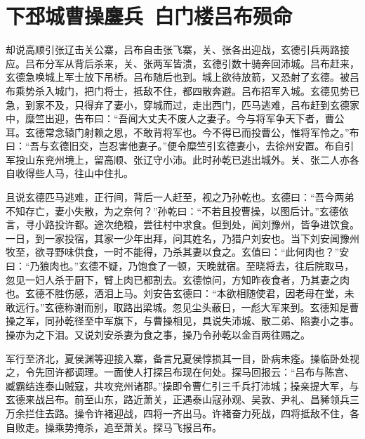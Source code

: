\chapter{下邳城曹操鏖兵~白门楼吕布殒命}

却说高顺引张辽击关公寨，吕布自击张飞寨，关、张各出迎战，玄德引兵两路接应。吕布分军从背后杀来，关、张两军皆溃，玄德引数十骑奔回沛城。吕布赶来，玄德急唤城上军士放下吊桥。吕布随后也到。城上欲待放箭，又恐射了玄德。被吕布乘势杀入城门，把门将士，抵敌不住，都四散奔避。吕布招军入城。玄德见势已急，到家不及，只得弃了妻小，穿城而过，走出西门，匹马逃难，吕布赶到玄德家中，糜竺出迎，告布曰：“吾闻大丈夫不废人之妻子。今与将军争天下者，曹公耳。玄德常念辕门射赖之恩，不敢背将军也。今不得已而投曹公，惟将军怜之。”布曰：“吾与玄德旧交，岂忍害他妻子。”便令糜竺引玄德妻小，去徐州安置。布自引军投山东兖州境上，留高顺、张辽守小沛。此时孙乾已逃出城外。关、张二人亦各自收得些人马，往山中住扎。

且说玄德匹马逃难，正行间，背后一人赶至，视之乃孙乾也。玄德曰：“吾今两弟不知存亡，妻小失散，为之奈何？”孙乾曰：“不若且投曹操，以图后计。”玄德依言，寻小路投许都。途次绝粮，尝往村中求食。但到处，闻刘豫州，皆争进饮食。一日，到一家投宿，其家一少年出拜，问其姓名，乃猎户刘安也。当下刘安闻豫州牧至，欲寻野味供食，一时不能得，乃杀其妻以食之。玄值曰：“此何肉也？”安曰：“乃狼肉也。”玄德不疑，乃饱食了一顿，天晚就宿。至晓将去，往后院取马，忽见一妇人杀于厨下，臂上肉已都割去。玄德惊问，方知昨夜食者，乃其妻之肉也。玄德不胜伤感，洒泪上马。刘安告玄德曰：“本欲相随使君，因老母在堂，未敢远行。”玄德称谢而别，取路出梁城。忽见尘头蔽日，一彪大军来到。玄德知是曹操之军，同孙乾径至中军旗下，与曹操相见，具说失沛城、散二弟、陷妻小之事。操亦为之下泪。又说刘安杀妻为食之事，操乃令孙乾以金百两往赐之。

军行至济北，夏侯渊等迎接入寨，备言兄夏侯惇损其一目，卧病未痊。操临卧处视之，令先回许都调理。一面使人打探吕布现在何处。探马回报云：“吕布与陈宫、臧霸结连泰山贼寇，共攻兖州诸郡。”操即令曹仁引三千兵打沛城；操亲提大军，与玄德来战吕布。前至山东，路近萧关，正遇泰山寇孙观、吴敦、尹礼、昌豨领兵三万余拦住去路。操令许褚迎战，四将一齐出马。许褚奋力死战，四将抵敌不住，各自败走。操乘势掩杀，追至萧关。探马飞报吕布。

